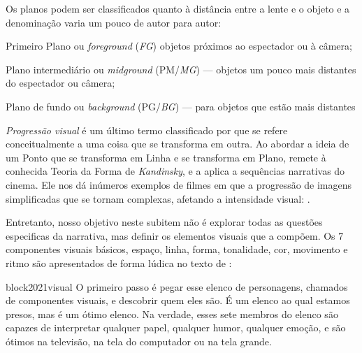 Os planos podem ser classificados quanto à distância entre a lente e o
objeto e a denominação varia um pouco de autor para autor:

Primeiro Plano ou \emph{foreground} (\emph{FG}) objetos próximos ao
espectador ou à câmera;

Plano intermediário ou \emph{midground} (PM/\emph{MG}) --- objetos um
pouco mais distantes do espectador ou câmera;

Plano de fundo ou \emph{background} (PG/\emph{BG}) --- para objetos que
estão mais distantes

\emph{Progressão visual} é um último termo classificado por
\textcite{block2021visual} que se refere conceitualmente
a uma coisa que se transforma em outra. Ao abordar a ideia de um Ponto
que se transforma em Linha e se transforma em Plano, remete à conhecida
Teoria da Forma de \emph{Kandinsky}, e a aplica a sequências narrativas
do cinema. Ele nos dá inúmeros exemplos de filmes em que a progressão de
imagens simplificadas que se tornam complexas, afetando a intensidade
visual: .

Entretanto, nosso objetivo neste subitem não é explorar todas as
questões especificas da narrativa, mas definir os elementos visuais que
a compõem. Os 7 componentes visuais básicos, espaço, linha, forma,
tonalidade, cor, movimento e ritmo são apresentados de forma lúdica no
texto de \textcite{block2021visual}:

\begin{displaycquote}[9]{block2021visual}
	O primeiro passo é pegar esse elenco de personagens, chamados de
	componentes visuais, e descobrir quem eles são. É um elenco ao qual
	estamos presos, mas é um ótimo elenco. Na verdade, esses sete membros do
	elenco são capazes de interpretar qualquer papel, qualquer humor,
	qualquer emoção, e são ótimos na televisão, na tela do computador ou na
  tela grande.
\end{displaycquote}

